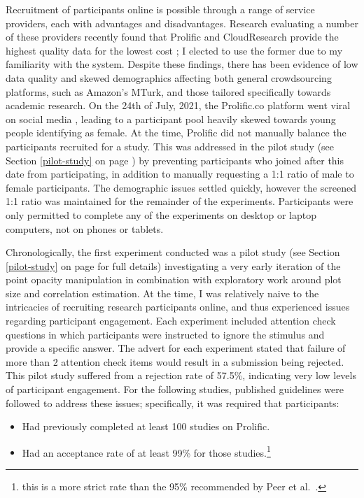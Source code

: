 \documentclass[../main.tex]{subfiles}
\begin{document}
Recruitment of participants online is possible through a range of
service providers, each with advantages and disadvantages. Research
evaluating a number of these providers recently found that Prolific
\cite{prolific} and CloudResearch provide the highest quality data for
the lowest cost \cite{douglas_2023}; I elected to use the former due to
my familiarity with the system. Despite these findings, there has been
evidence of low data quality and skewed demographics affecting both
general crowdsourcing platforms, such as Amazon's MTurk, and those
tailored specifically towards academic research. On the 24th of July,
2021, the Prolific.co platform went viral on social media
\cite{charalambides_2021}, leading to a participant pool heavily skewed
towards young people identifying as female. At the time, Prolific did
not manually balance the participants recruited for a study. This was
addressed in the pilot study (see Section \ref{pilot-study} on page
\pageref{pilot-study}) by preventing participants who joined after this
date from participating, in addition to manually requesting a 1:1 ratio
of male to female participants. The demographic issues settled quickly,
however the screened 1:1 ratio was maintained for the remainder of the
experiments. Participants were only permitted to complete any of the
experiments on desktop or laptop computers, not on phones or tablets.

Chronologically, the first experiment conducted was a pilot study (see
Section \ref{pilot-study} on page \pageref{pilot-study} for full
details) investigating a very early iteration of the point opacity
manipulation in combination with exploratory work around plot size and
correlation estimation. At the time, I was relatively naive to the
intricacies of recruiting research participants online, and thus
experienced issues regarding participant engagement. Each experiment
included attention check questions in which participants were instructed
to ignore the stimulus and provide a specific answer. The advert for
each experiment stated that failure of more than 2 attention check items
would result in a submission being rejected. This pilot study suffered
from a rejection rate of 57.5\%, indicating very low levels of
participant engagement. For the following studies, published guidelines
\cite{peer_2021} were followed to address these issues; specifically, it
was required that participants:

\begin{itemize}
\tightlist
\item
  Had previously completed at least 100 studies on Prolific.
\item
  Had an acceptance rate of at least 99\% for those studies.\footnote{this
    is a more strict rate than the 95\% recommended by Peer et
    al.~\cite{peer_2021}.}
\end{itemize}
\end{document}
